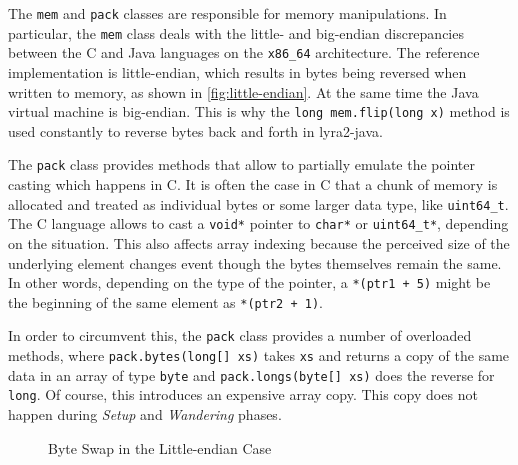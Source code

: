 The \texttt{mem} and \texttt{pack} classes are responsible for memory manipulations. In particular, the \texttt{mem} class deals with the little- and big-endian discrepancies between the C and Java languages on the \texttt{x86\_64} architecture. The reference implementation is little-endian, which results in bytes being reversed when written to memory, as shown in \autoref{fig:little-endian}. At the same time the Java virtual machine is big-endian. This is why the \texttt{long mem.flip(long x)} method is used constantly to reverse bytes back and forth in lyra2-java.

The \texttt{pack} class provides methods that allow to partially emulate the pointer casting which happens in C. It is often the case in C that a chunk of memory is allocated and treated as individual bytes or some larger data type, like \texttt{uint64\_t}. The C language allows to cast a \texttt{void*} pointer to \texttt{char*} or \texttt{uint64\_t*}, depending on the situation. This also affects array indexing because the perceived size of the underlying element changes event though the bytes themselves remain the same. In other words, depending on the type of the pointer, a \texttt{*(ptr1 + 5)} might be the beginning of the same element as \texttt{*(ptr2 + 1)}.

In order to circumvent this, the \texttt{pack} class provides a number of overloaded methods, where \texttt{pack.bytes(long[] xs)} takes \texttt{xs} and returns a copy of the same data in an array of type \texttt{byte} and \texttt{pack.longs(byte[] xs)} does the reverse for \texttt{long}. Of course, this introduces an expensive array copy. This copy does not happen during \emph{Setup} and \emph{Wandering} phases.

\begin{figure}
    \centering
    \caption{Byte Swap in the Little-endian Case}
    \label{fig:little-endian}
  \end{figure}

